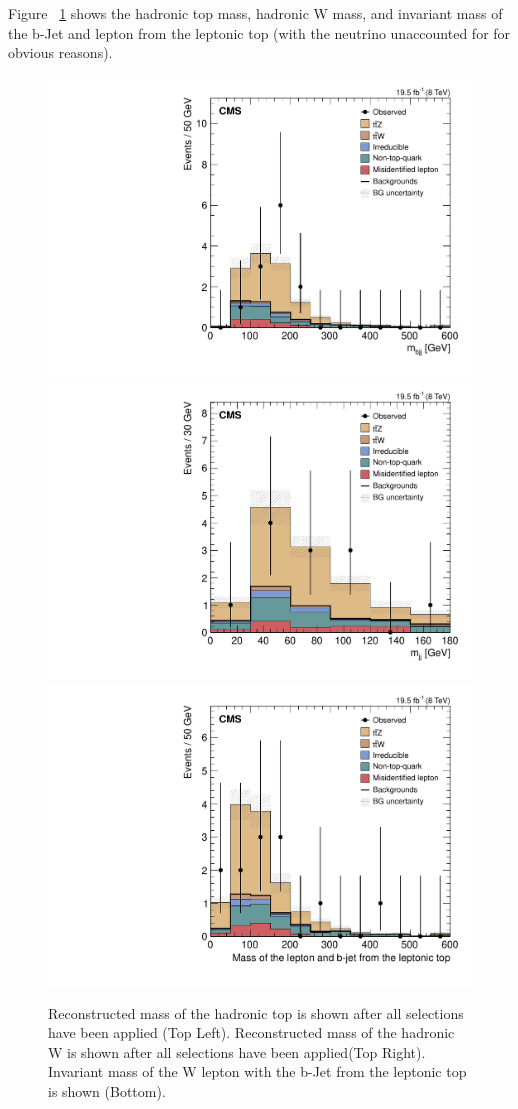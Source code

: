Figure ~\ref{fig:htopmass_3l2j2b} shows the hadronic top mass, hadronic W mass, and invariant mass of the b-Jet and lepton from the leptonic top (with the neutrino unaccounted for for obvious reasons).


\begin{figure}[h]
\begin{center}
\includegraphics[width=0.48\linewidth]{Figs/Plots_Final_Selections/hTopMass_3L2J2b.pdf}
\includegraphics[width=0.48\linewidth]{Figs/Plots_Final_Selections/hTopWMass_3L2J2b.pdf}
\includegraphics[width=0.48\linewidth]{Figs/Plots_Final_Selections/hTopbLMass_3L2J2b.pdf}
\caption{\label{fig:htopmass_3l2j2b}
Reconstructed mass of the hadronic top is shown after all selections have been applied (Top Left). Reconstructed mass of the hadronic W is shown after all selections have been applied(Top Right). Invariant mass of the W lepton with the b-Jet from the leptonic top is shown (Bottom).
}
\end{center}
\end{figure}
	
	
	
	
	
	
	

